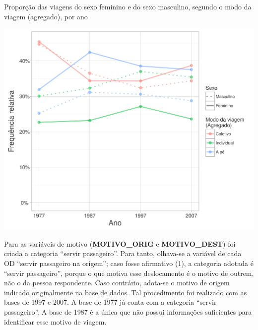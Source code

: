 \begin{grafico}[htb]%
    \caption{\label{graf:freq-tipo-viag}Proporção das viagens do sexo feminino e do sexo masculino, segundo o modo da viagem (agregado), por ano}%
    \begin{center}%
        \includegraphics[width=1\textwidth]{./imagens/freq-tipo-viag.png}%
    \end{center}%
\end{grafico}%

Para as variáveis de motivo (\textbf{MOTIVO_ORIG} e \textbf{MOTIVO_DEST}) foi criada a categoria ``servir passageiro''. Para tanto, olhava-se a variável de cada OD ``servir passageiro na origem''; caso fosse afirmativo (1), a categoria adotada é ``servir passageiro'', porque o que motiva esse deslocamento é o motivo de outrem, não o da pessoa respondente. Caso contrário, adota-se o motivo de origem indicado originalmente na base de dados. Tal procedimento foi realizado com as bases de 1997 e 2007. A base de 1977 já conta com a categoria ``servir passageiro''. A base de 1987 é a única que não possui informações suficientes para identificar esse motivo de viagem.

